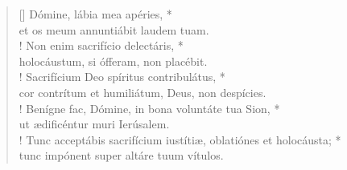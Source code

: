 \begin{verse}[\versewidth]
Dómine, lábia mea apéries, *\\
et os meum annuntiábit laudem tuam.\\!
\vin Non enim sacrifício delectáris, *\\
\vin holocáustum, si ófferam, non placébit.\\!
Sacrifícium Deo spíritus contribulátus, *\\
cor contrítum et humiliátum, Deus, non despícies.\\!
\vin Benígne fac, Dómine, in bona voluntáte tua Sion, *\\
\vin ut ædificéntur muri Ierúsalem.\\!
Tunc acceptábis sacrifícium iustítiæ, oblatiónes et holocáusta; *\\
tunc impónent super altáre tuum vítulos.\\
\end{verse}
\vspace{1cm}


